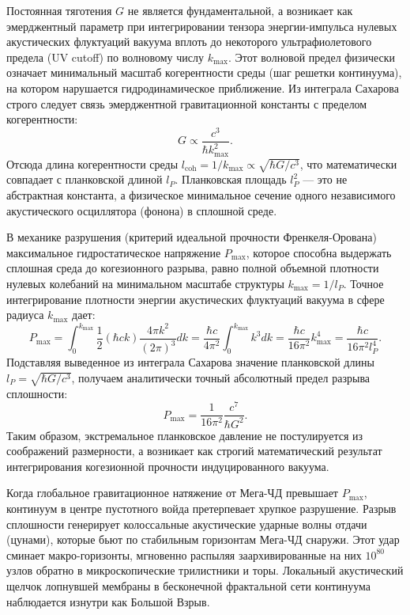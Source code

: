 \documentclass[11pt,a4paper]{article}
\begin{document}
	Постоянная тяготения $G$ не является фундаментальной, а возникает как эмерджентный параметр при интегрировании тензора энергии-импульса нулевых акустических флуктуаций вакуума вплоть до некоторого ультрафиолетового предела (UV cutoff) по волновому числу $k_{\text{max}}$. Этот волновой предел физически означает минимальный масштаб когерентности среды (шаг решетки континуума), на котором нарушается гидродинамическое приближение. 
	Из интеграла Сахарова строго следует связь эмерджентной гравитационной константы с пределом когерентности:
	\begin{equation}
		G \propto \frac{c^3}{\hbar k_{\text{max}}^2}.
	\end{equation}
	Отсюда длина когерентности среды $l_{\text{coh}} = 1/k_{\text{max}} \propto \sqrt{\hbar G / c^3}$, что математически совпадает с планковской длиной $l_P$. Планковская площадь $l_P^2$ — это не абстрактная константа, а физическое минимальное сечение одного независимого акустического осциллятора (фонона) в сплошной среде.
	
	В механике разрушения (критерий идеальной прочности Френкеля-Орована) максимальное гидростатическое напряжение $P_{\text{max}}$, которое способна выдержать сплошная среда до когезионного разрыва, равно полной объемной плотности нулевых колебаний на минимальном масштабе структуры $k_{\text{max}} = 1/l_P$.
	Точное интегрирование плотности энергии акустических флуктуаций вакуума в сфере радиуса $k_{\text{max}}$ дает:
	\begin{equation}
		P_{\text{max}} = \int_0^{k_{\text{max}}} \frac{1}{2} (\hbar c k) \frac{4\pi k^2}{(2\pi)^3} dk = \frac{\hbar c}{4\pi^2} \int_0^{k_{\text{max}}} k^3 dk = \frac{\hbar c}{16\pi^2} k_{\text{max}}^4 = \frac{\hbar c}{16\pi^2 l_P^4}.
	\end{equation}
	Подставляя выведенное из интеграла Сахарова значение планковской длины $l_P = \sqrt{\hbar G / c^3}$, получаем аналитически точный абсолютный предел разрыва сплошности:
	\begin{equation}
		P_{\text{max}} = \frac{1}{16\pi^2} \frac{c^7}{\hbar G^2}.
	\end{equation}
	Таким образом, экстремальное планковское давление не постулируется из соображений размерности, а возникает как строгий математический результат интегрирования когезионной прочности индуцированного вакуума.
	
	Когда глобальное гравитационное натяжение от Мега-ЧД превышает $P_{\text{max}}$, континуум в центре пустотного войда претерпевает хрупкое разрушение. Разрыв сплошности генерирует колоссальные акустические ударные волны отдачи (цунами), которые бьют по стабильным горизонтам Мега-ЧД снаружи. Этот удар сминает макро-горизонты, мгновенно распыляя заархивированные на них $10^{80}$ узлов обратно в микроскопические трилистники и торы. Локальный акустический щелчок лопнувшей мембраны в бесконечной фрактальной сети континуума наблюдается изнутри как Большой Взрыв.
	
\end{document}
